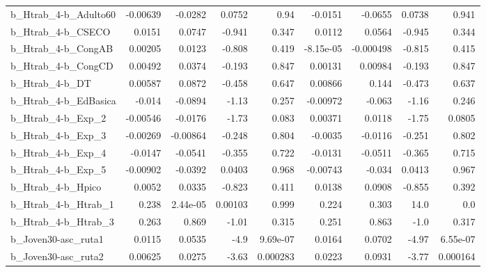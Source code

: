 \begin{tabular}{lrrrrrrrr}
b\_Htrab\_4-b\_Adulto60       &    -0.00639 &      -0.0282 &   0.0752 &     0.94 &    -0.0151 &     -0.0655 &       0.0738 &         0.941 \\
b\_Htrab\_4-b\_CSECO          &      0.0151 &       0.0747 &   -0.941 &    0.347 &     0.0112 &      0.0564 &       -0.945 &         0.344 \\
b\_Htrab\_4-b\_CongAB         &     0.00205 &       0.0123 &   -0.808 &    0.419 &  -8.15e-05 &   -0.000498 &       -0.815 &         0.415 \\
b\_Htrab\_4-b\_CongCD         &     0.00492 &       0.0374 &   -0.193 &    0.847 &    0.00131 &     0.00984 &       -0.193 &         0.847 \\
b\_Htrab\_4-b\_DT             &     0.00587 &       0.0872 &   -0.458 &    0.647 &    0.00866 &       0.144 &       -0.473 &         0.637 \\
b\_Htrab\_4-b\_EdBasica       &      -0.014 &      -0.0894 &    -1.13 &    0.257 &   -0.00972 &      -0.063 &        -1.16 &         0.246 \\
b\_Htrab\_4-b\_Exp\_2          &    -0.00546 &      -0.0176 &    -1.73 &    0.083 &    0.00371 &      0.0118 &        -1.75 &        0.0805 \\
b\_Htrab\_4-b\_Exp\_3          &    -0.00269 &     -0.00864 &   -0.248 &    0.804 &    -0.0035 &     -0.0116 &       -0.251 &         0.802 \\
b\_Htrab\_4-b\_Exp\_4          &     -0.0147 &      -0.0541 &   -0.355 &    0.722 &    -0.0131 &     -0.0511 &       -0.365 &         0.715 \\
b\_Htrab\_4-b\_Exp\_5          &    -0.00902 &      -0.0392 &   0.0403 &    0.968 &   -0.00743 &      -0.034 &       0.0413 &         0.967 \\
b\_Htrab\_4-b\_Hpico          &      0.0052 &       0.0335 &   -0.823 &    0.411 &     0.0138 &      0.0908 &       -0.855 &         0.392 \\
b\_Htrab\_4-b\_Htrab\_1        &       0.238 &     2.44e-05 &  0.00103 &    0.999 &      0.224 &       0.303 &         14.0 &           0.0 \\
b\_Htrab\_4-b\_Htrab\_3        &       0.263 &        0.869 &    -1.01 &    0.315 &      0.251 &       0.863 &         -1.0 &         0.317 \\
b\_Joven30-asc\_ruta1        &      0.0115 &       0.0535 &     -4.9 & 9.69e-07 &     0.0164 &      0.0702 &        -4.97 &      6.55e-07 \\
b\_Joven30-asc\_ruta2        &     0.00625 &       0.0275 &    -3.63 & 0.000283 &     0.0223 &      0.0931 &        -3.77 &      0.000164 \\

\end{tabular}
